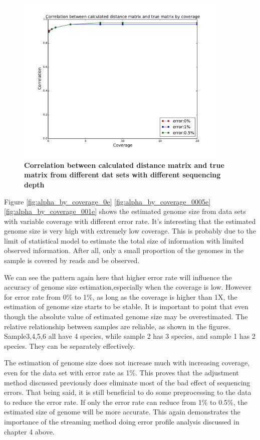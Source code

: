 \begin{figure}[!ht]
 \centerline{\includegraphics[width=4in]{./figures/beta_by_coverage.pdf}}
\caption{\bf Correlation between calculated distance matrix and true matrix from different dat sets with different sequencing depth}
\label{fig:IGS_correlation_coverage}
\end{figure}



Figure \ref{fig:alpha_by_coverage_0e} \ref{fig:alpha_by_coverage_0005e} \ref{fig:alpha_by_coverage_001e} 
shows the estimated genome size 
from data sets with variable coverage with different error rate.
It's interesting that the estimated genome size is very high with extremely low 
coverage. This is probably due to the limit of statistical model to estimate
the total size of information with limited observed information.
After all, only a small proportion of the genomes in the sample is covered by
reads and be observed. 

We can see the pattern again here that higher error rate will influence the accuracy
of genome size estimation,especially when the coverage is low. However for error rate
from 0\% to 1\%, as long as the coverage is higher than 1X, the estimation of 
genome size starts to be stable. 
It is important to point that even though the absolute value of estimated 
genome size may be overestimated. The relative relationship between samples 
are reliable, as shown in the figures. Sample3,4,5,6 all have 4 species, while 
sample 2 has 3 species, and sample 1 has 2 species. 
They can be separately effectively.

The estimation of genome size does not increase much with increasing coverage, 
even for the data set with error rate as 1\%. This proves that the adjustment method discussed
previously does eliminate most of the bad effect of sequencing errors. 
That being said, it is still beneficial to do some preprocessing to the data
to reduce the error rate. If only the error rate can reduce from 1\% to 0.5\%, the 
estimated size of genome will be more accurate. This again demonstrates the importance of
the streaming method doing error profile analysis discussed in chapter 4 above.

